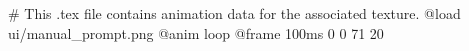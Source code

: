 # This .tex file contains animation data for the associated texture.
@load ui/manual_prompt.png
@anim loop
	@frame 100ms 0 0 71 20